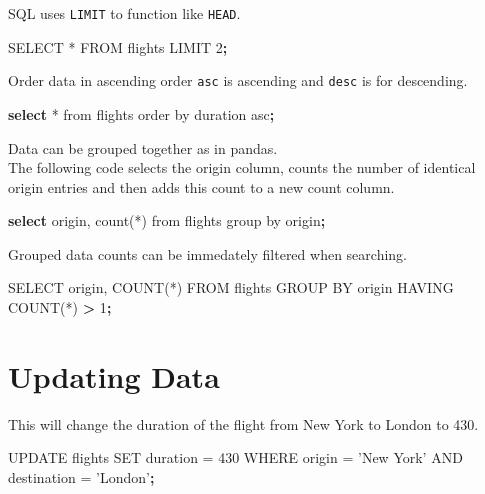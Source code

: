 \documentclass[]{book}
\newenvironment{Shaded}{\begin{snugshade}}{\end{snugshade}}
\newcommand{\ExtensionTok}[1]{#1}
\newcommand{\KeywordTok}[1]{\textcolor[rgb]{0.13,0.29,0.53}{\textbf{#1}}}
\newcommand{\NormalTok}[1]{#1}
\newcommand{\OperatorTok}[1]{\textcolor[rgb]{0.81,0.36,0.00}{\textbf{#1}}}
\newcommand{\StringTok}[1]{\textcolor[rgb]{0.31,0.60,0.02}{#1}}
\begin{document}
SQL uses \texttt{LIMIT} to function like \texttt{HEAD}.

\begin{Shaded}
\begin{Highlighting}[]
\ExtensionTok{SELECT}\NormalTok{ * FROM flights LIMIT 2}\KeywordTok{;}
\end{Highlighting}
\end{Shaded}

Order data in ascending order \texttt{asc} is ascending and \texttt{desc} is for descending.

\begin{Shaded}
\begin{Highlighting}[]
\KeywordTok{select} \ExtensionTok{*}\NormalTok{ from flights order by duration asc}\KeywordTok{;}
\end{Highlighting}
\end{Shaded}

Data can be grouped together as in pandas.\\
The following code selects the origin column, counts the number of identical origin entries and then adds this count to a new count column.

\begin{Shaded}
\begin{Highlighting}[]
\KeywordTok{select} \ExtensionTok{origin}\NormalTok{, count(*) }\ExtensionTok{from}\NormalTok{ flights group by origin}\KeywordTok{;}
\end{Highlighting}
\end{Shaded}

Grouped data counts can be immedately filtered when searching.

\begin{Shaded}
\begin{Highlighting}[]
\ExtensionTok{SELECT}\NormalTok{ origin, COUNT(*) }\ExtensionTok{FROM}\NormalTok{ flights GROUP BY origin HAVING COUNT(*) }\OperatorTok{>} \ExtensionTok{1}\KeywordTok{;}
\end{Highlighting}
\end{Shaded}

\hypertarget{updating-data}{%
\section{Updating Data}\label{updating-data}}

This will change the duration of the flight from New York to London to 430.

\begin{Shaded}
\begin{Highlighting}[]
\ExtensionTok{UPDATE}\NormalTok{ flights}
\ExtensionTok{SET}\NormalTok{ duration = 430}
\ExtensionTok{WHERE}\NormalTok{ origin = }\StringTok{'New York'}
\ExtensionTok{AND}\NormalTok{ destination = }\StringTok{'London'}\KeywordTok{;}
\end{Highlighting}
\end{Shaded}
\end{document}
